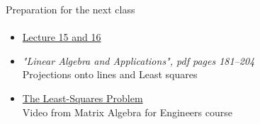 \documentclass[aspectratio=169]{beamer}
\newcommand{\fbckg}[1]{\usebackgroundtemplate{\texttt{[image: \#1]}}}%
\begin{document}
\begin{frame}[t]{Preparation for the next class}
    \framesubtitle{}
    \Large
    \begin{itemize}
        \item \href{https://www.youtube.com/watch?v=Y_Ac6KiQ1t0&list=PL49CF3715CB9EF31D&index=15}{Lecture 15 and 16}
        \item \textit{"Linear Algebra and Applications", pdf pages 181--204 }\\ Projections onto lines and Least squares
        \item \href{https://www.coursera.org/lecture/matrix-algebra-engineers/the-least-squares-problem-I56Qy}{The Least-Squares Problem}\\ Video from Matrix Algebra for Engineers course
    \end{itemize}
\end{frame}

\usebackgroundtemplate{}


\fbckg{fibeamer/figs/last_page.png}
\frame[plain]{}
\end{document}
